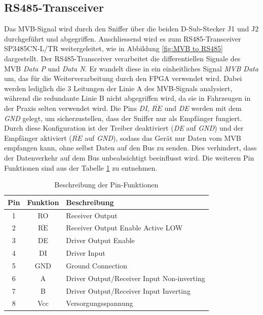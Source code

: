 \subsection{RS485-Transceiver}

Das MVB-Signal wird durch den Sniffer über die beiden D-Sub-Stecker J1 und J2 durchgeführt und abgegriffen. Anschliessend wird es zum RS485-Transceiver SP3485CN-L/TR weitergeleitet, wie in Abbildung \ref{fig:MVB to RS485} dargestellt. Der RS485-Transceiver verarbeitet die differentiellen Signale des MVB \textit{Data P} und \textit{Data N}. Er wandelt diese in ein einheitliches Signal \textit{MVB Data} um, das für die Weiterverarbeitung durch den FPGA verwendet wird. Dabei werden lediglich die 3 Leitungen der Linie A des MVB-Signals analysiert, während die redundante Linie B nicht abgegriffen wird, da sie in Fahrzeugen in der Praxis selten verwendet wird. Die Pins \textit{DI}, $\overline{RE}$ und \textit{DE} werden mit dem \textit{GND} gelegt, um sicherzustellen, dass der Sniffer nur als Empfänger fungiert. Durch diese Konfiguration ist der Treiber deaktiviert (\textit{DE} auf \textit{GND}) und der Empfänger aktiviert ($\overline{RE}$ auf \textit{GND}), sodass das Gerät nur Daten vom MVB empfangen kann, ohne selbst Daten auf den Bus zu senden. Dies verhindert, dass der Datenverkehr auf dem Bus unbeabsichtigt beeinflusst wird. Die weiteren Pin Funktionen sind aus der Tabelle \ref{tab:pin_funktionen} zu entnehmen.

\begin{table}[h]
  \centering
  \begin{tabular}{|c|c|l|}
    \hline
    \textbf{Pin} & \textbf{Funktion} & \textbf{Beschreibung} \\ \hline
    1 & RO & Receiver Output \\ \hline
    2 & $\overline{\text{RE}}$ & Receiver Output Enable Active LOW \\ \hline
    3 & DE & Driver Output Enable \\ \hline
    4 & DI & Driver Input \\ \hline
    5 & GND & Ground Connection \\ \hline
    6 & A & Driver Output/Receiver Input Non-inverting \\ \hline
    7 & B & Driver Output/Receiver Input Inverting\\ \hline
    8 & Vcc & Versorgungsspannung \\ \hline
  \end{tabular}
  \caption{Beschreibung der Pin-Funktionen}
  \label{tab:pin_funktionen}
\end{table}
 
